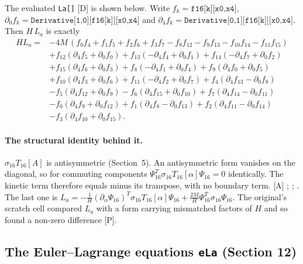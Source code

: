 The evaluated \texttt{La[]} [D] is shown below. Write $f_k=\texttt{f16[k][x0,x4]}$,
$\partial_0 f_k=\texttt{Derivative[1,0][f16[k]][x0,x4]}$ and
$\partial_4 f_k=\texttt{Derivative[0,1][f16[k]][x0,x4]}$. Then $H\,L_a$ is exactly
\begin{align*}
H L_a ={}& -4M\,(f_0f_4+f_1f_5+f_2f_6+f_3f_7-f_8f_{12}-f_9f_{13}-f_{10}f_{14}-f_{11}f_{15})\\
&+f_{12}(\partial_4f_5+\partial_0f_0)+f_{13}(-\partial_4f_4+\partial_0f_1)+f_{14}(-\partial_4f_7+\partial_0f_2)\\
&+f_{15}(\partial_4f_6+\partial_0f_3)+f_{8}(-\partial_4f_1+\partial_0f_4)+f_{9}(\partial_4f_0+\partial_0f_5)\\
&+f_{10}(\partial_4f_3+\partial_0f_6)+f_{11}(-\partial_4f_2+\partial_0f_7)+f_{4}(\partial_4f_{13}-\partial_0f_8)\\
&-f_{5}(\partial_4f_{12}+\partial_0f_9)-f_{6}(\partial_4f_{15}+\partial_0f_{10})+f_{7}(\partial_4f_{14}-\partial_0f_{11})\\
&-f_{0}(\partial_4f_9+\partial_0f_{12})+f_{1}(\partial_4f_8-\partial_0f_{13})+f_{2}(\partial_4f_{11}-\partial_0f_{14})\\
&-f_{3}(\partial_4f_{10}+\partial_0f_{15}).
\end{align*}

\paragraph{The structural identity behind it.} $\sigma_{16}T_{16}[A]$ is antisymmetric
(Section~5). An antisymmetric form vanishes on the diagonal, so for commuting components
$\Psi_{16}^{T}\sigma_{16}T_{16}[\alpha]\Psi_{16}=0$ identically. The kinetic term therefore equals
minus its transpose, with no boundary term. [A]
;
;
. The last one is
$L_a = -\tfrac1H(\partial_\alpha\Psi_{16})^{T}\sigma_{16}T_{16}[\alpha]\Psi_{16}
+\tfrac{2M}{H}\Psi_{16}^{T}\sigma_{16}\Psi_{16}$. The original's scratch cell compared $L_a$ with a
form carrying mismatched factors of $H$ and so found a non-zero difference [P].

\subsection{The Euler--Lagrange equations \texttt{eLa} (Section 12)}
\label{fnd:eLa}\label{sec:2.8}

